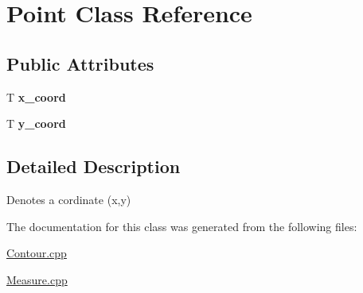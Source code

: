 \hypertarget{classPoint}{}\section{Point Class Reference}
\label{classPoint}
\subsection*{Public Attributes}
\begin{DoxyCompactItemize}
\item 
\mbox{\label{classPoint_a4a2a3771336f516660cf5bb95dd6895f}} 
T {\bfseries x\+\_\+coord}
\item 
\mbox{\label{classPoint_ab5babcbd7dce457f742082ca27b61073}} 
T {\bfseries y\+\_\+coord}
\end{DoxyCompactItemize}


\subsection{Detailed Description}
Denotes a cordinate (x,y) 

The documentation for this class was generated from the following files\+:\begin{DoxyCompactItemize}
\item 
\hyperlink{Contour_8cpp}{Contour.\+cpp}\item 
\hyperlink{Measure_8cpp}{Measure.\+cpp}\end{DoxyCompactItemize}
